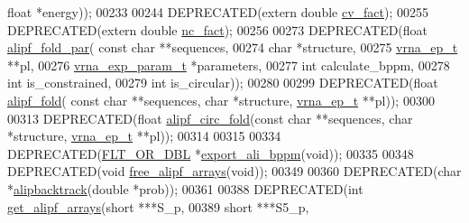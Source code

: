 \begin{DoxyCode}
{      float} *energy));
00233 
00244 DEPRECATED(\textcolor{keyword}{extern}  \textcolor{keywordtype}{double}  \hyperlink{group__consensus__fold_gaf3cbac6ff5d706d6e414677841ddf94c}{cv\_fact});
00255 DEPRECATED(\textcolor{keyword}{extern}  \textcolor{keywordtype}{double}  \hyperlink{group__consensus__fold_ga502948a122a2af5b914355b1f3ea2f61}{nc\_fact});
00256 
00273 DEPRECATED(\textcolor{keywordtype}{float} \hyperlink{group__consensus__pf__fold_gab46954fb0ed3b6d5631e7f9b802978cd}{alipf\_fold\_par}( \textcolor{keyword}{const} \textcolor{keywordtype}{char} **sequences,
00274                       \textcolor{keywordtype}{char} *structure,
00275                       \hyperlink{group__struct__utils_structvrna__elem__prob__s}{vrna\_ep\_t} **pl,
00276                       \hyperlink{group__energy__parameters_structvrna__exp__param__s}{vrna\_exp\_param\_t} *parameters,
00277                       \textcolor{keywordtype}{int} calculate\_bppm,
00278                       \textcolor{keywordtype}{int} is\_constrained,
00279                       \textcolor{keywordtype}{int} is\_circular));
00280 
00299 DEPRECATED(\textcolor{keywordtype}{float} \hyperlink{group__consensus__pf__fold_ga1a5f6cfb9d761fa862ce4edc7c369cd2}{alipf\_fold}( \textcolor{keyword}{const} \textcolor{keywordtype}{char} **sequences, \textcolor{keywordtype}{char} *structure, 
      \hyperlink{group__struct__utils_structvrna__elem__prob__s}{vrna\_ep\_t} **pl));
00300 
00313 DEPRECATED(\textcolor{keywordtype}{float} \hyperlink{group__consensus__pf__fold_ga604a42ad64178279551ad3e4def3d603}{alipf\_circ\_fold}(\textcolor{keyword}{const} \textcolor{keywordtype}{char} **sequences, \textcolor{keywordtype}{char} *structure, 
      \hyperlink{group__struct__utils_structvrna__elem__prob__s}{vrna\_ep\_t} **pl));
00314 
00315 
00334 DEPRECATED(\hyperlink{group__data__structures_ga31125aeace516926bf7f251f759b6126}{FLT\_OR\_DBL} *\hyperlink{group__consensus__pf__fold_ga11b6ab8bd9be1821fea352b190a01cab}{export\_ali\_bppm}(\textcolor{keywordtype}{void}));
00335 
00348 DEPRECATED(\textcolor{keywordtype}{void}  \hyperlink{group__consensus__pf__fold_ga0c0498f35686e26b38ee460d3db1a661}{free\_alipf\_arrays}(\textcolor{keywordtype}{void}));
00349 
00360 DEPRECATED(\textcolor{keywordtype}{char}  *\hyperlink{group__consensus__stochbt_ga0df40248788f0fb17ebdc59d74116d1c}{alipbacktrack}(\textcolor{keywordtype}{double} *prob));
00361 
00388 DEPRECATED(\textcolor{keywordtype}{int} \hyperlink{group__consensus__fold_ga5349960075b1847720a2e9df021e2675}{get\_alipf\_arrays}(\textcolor{keywordtype}{short} ***S\_p,
00389                      \textcolor{keywordtype}{short} ***S5\_p,

\end{DoxyCode}
